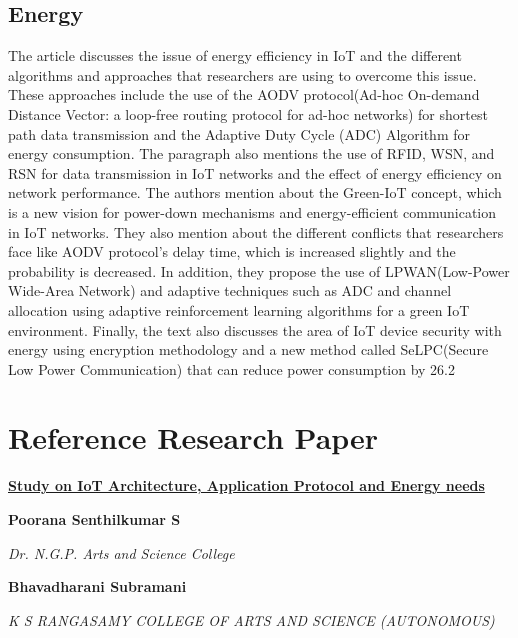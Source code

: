 \documentclass{article}
\begin{document}
\subsection{Energy}
 The article discusses the issue of energy efficiency in IoT and the different algorithms and approaches that researchers are using to overcome this issue. These approaches include the use of the AODV protocol(Ad-hoc On-demand Distance Vector: a loop-free routing protocol for ad-hoc networks) for shortest path data transmission and the Adaptive Duty Cycle (ADC) Algorithm for energy consumption. The paragraph also mentions the use of RFID, WSN, and RSN for data transmission in IoT networks and the effect of energy efficiency on network performance. The authors mention about the Green-IoT concept, which is a new vision for power-down mechanisms and energy-efficient communication in IoT networks. They also mention about the different conflicts that researchers face like AODV protocol's delay time, which is increased slightly and the probability is decreased. In addition, they propose the use of LPWAN(Low-Power Wide-Area Network) and adaptive techniques such as ADC and channel allocation using adaptive reinforcement learning algorithms for a green IoT environment. Finally, the text also discusses the area of IoT device security with energy using encryption methodology and a new method called SeLPC(Secure Low Power Communication) that can reduce power consumption by 26.2%

\section{Reference Research Paper}


\href{https://drive.google.com/file/d/1bUMbR2HERnViNIY0Zxo2yNvXsN4xiVm9/view?usp=sharing}{\textbf{Study on IoT Architecture, Application Protocol and Energy needs}}

\textbf{Poorana Senthilkumar S}

\textit{Dr. N.G.P. Arts and Science College}

\textbf{Bhavadharani Subramani}

\textit{K S RANGASAMY COLLEGE OF ARTS AND SCIENCE (AUTONOMOUS)}
\end{document}
